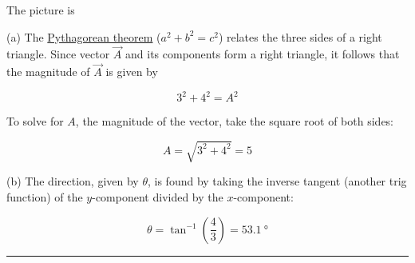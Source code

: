 \documentclass{article}
\begin{document}
\Solution The picture is

\begin{figure}[h!]
    \centering
{}
\end{figure}

(a) The \href{https://mathworld.wolfram.com/PythagoreanTheorem.html}{Pythagorean theorem} ($a^2 + b^2 = c^2$) relates the three sides of a right triangle. Since vector $\vec{A}$ and its components form a right triangle, it follows that the magnitude of $\vec{A}$ is given by

\begin{equation*}
    3^2 + 4^2 = A^2
\end{equation*}

To solve for $A$, the magnitude of the vector, take the square root of both sides:

\begin{equation*}
    A = \sqrt{3^2 + 4^2} = 5
\end{equation*}

(b) The direction, given by $\theta$, is found by taking the inverse tangent (another trig function) of the $y$-component divided by the $x$-component:

\begin{equation*}
    \theta = \tan^{-1}\left(\frac{4}{3}\right) = \SI{53.1}{\degree}
\end{equation*}

\hrule

\clearpage
\end{document}
